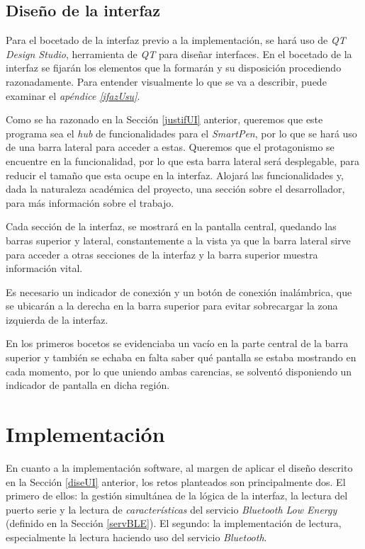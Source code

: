 \subsection{Diseño de la interfaz\label{diseUI}}
Para el bocetado de la interfaz previo a la implementación, se hará uso
de \textit{QT Design Studio}, herramienta de \textit{QT} para diseñar
interfaces.
En el bocetado de la interfaz se fijarán los elementos que la formarán
y su disposición procediendo razonadamente.
Para entender visualmente lo que se va a describir, puede examinar el \textit{apéndice
\ref{ifazUsu}}.


Como se ha razonado en la
Sección \ref{justifUI} anterior, queremos que este programa sea el
\textit{hub} de funcionalidades para el \textit{SmartPen}, por lo que
se hará uso de una barra lateral para acceder a estas. Queremos que
el protagonismo se encuentre en la funcionalidad, por lo que esta
barra lateral será desplegable, para reducir el tamaño que esta ocupe
en la interfaz. Alojará las funcionalidades y, dada la naturaleza académica
del proyecto, una sección sobre el desarrollador, para más información sobre
el trabajo.

Cada sección de la interfaz, se
mostrará en la pantalla central, quedando las barras superior y lateral,
constantemente a la vista ya que la barra lateral sirve para acceder
a otras secciones de la interfaz y la barra superior muestra información
vital.

Es necesario un indicador de conexión y un botón de conexión inalámbrica,
que se ubicarán a la derecha en la barra superior para evitar sobrecargar
la zona izquierda de la interfaz.

En los primeros bocetos se evidenciaba un vacío en la parte central de
la barra superior y también se echaba en falta saber qué pantalla se estaba
mostrando en cada momento, por lo que uniendo ambas carencias, se
solventó disponiendo un indicador de pantalla en dicha región. 

\section{Implementación\label{implemUI}}
En cuanto a la implementación software, al margen de aplicar el diseño
descrito en la Sección \ref{diseUI} anterior, los retos planteados
son principalmente dos.
El primero de ellos: la gestión simultánea de la lógica de la interfaz, la lectura
del puerto serie y la lectura de \textit{características} del servicio
\textit{Bluetooth Low Energy} (definido en la Sección \ref{servBLE}).
El segundo: la implementación de lectura, especialmente la lectura haciendo
uso del servicio \textit{Bluetooth}.

